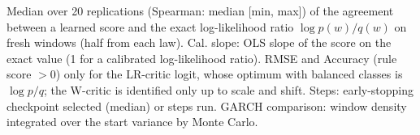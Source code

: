 Median over 20 replications (Spearman: median [min, max]) of the agreement between a learned score and the exact log-likelihood ratio $\log p(w)/q(w)$ on fresh windows (half from each law). Cal. slope: OLS slope of the score on the exact value (1 for a calibrated log-likelihood ratio). RMSE and Accuracy (rule score $>0$) only for the LR-critic logit, whose optimum with balanced classes is $\log p/q$; the W-critic is identified only up to scale and shift. Steps: early-stopping checkpoint selected (median) or steps run. GARCH comparison: window density integrated over the start variance by Monte Carlo.
